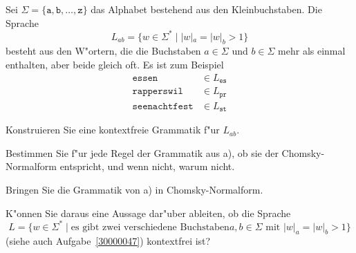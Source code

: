 Sei $\Sigma=\{\texttt{a},\texttt{b},\dots,\texttt{z}\}$ das Alphabet
bestehend aus den Kleinbuchstaben.
Die Sprache
\[
L_{ab}=\{w\in\Sigma^*\;|\; |w|_a=|w|_b>1\}
\]
besteht aus den W"ortern, die die Buchstaben $a\in \Sigma$ und $b\in\Sigma$
mehr als einmal enthalten, aber beide gleich oft.
Es ist zum Beispiel
\begin{align*}
\texttt{essen}&\in L_{\texttt{es}}\\
\texttt{rapperswil}&\in L_{\texttt{pr}}\\
\texttt{seenachtfest}&\in L_{\texttt{st}}
\end{align*}
\begin{teilaufgaben}
\item
Konstruieren Sie eine kontextfreie Grammatik f"ur $L_{ab}$.
\item
Bestimmen Sie f"ur jede Regel der Grammatik aus a), ob sie der
Chomsky-Normalform entspricht, und wenn nicht, warum nicht.
\item
Bringen Sie die Grammatik von a) in Chomsky-Normalform.
\item
K"onnen Sie daraus eine Aussage dar"uber ableiten, ob die Sprache 
\[
L=\{w\in\Sigma^*\;|\;\text{es gibt zwei verschiedene Buchstaben
$a,b\in\Sigma$ mit $|w|_a=|w|_b > 1$}\}
\]
(siehe auch Aufgabe~\ref{30000047}) kontextfrei ist?
\end{teilaufgaben}

